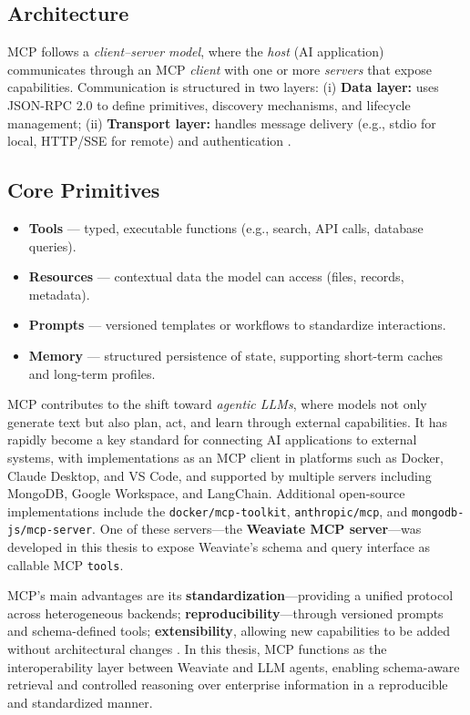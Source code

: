 \subsection{Architecture} 
MCP follows a \textit{client--server model}, where the \textit{host} (AI application) communicates through an MCP \textit{client} with one or more \textit{servers} that expose capabilities. Communication is structured in two layers:
(i) \textbf{Data layer:} uses JSON-RPC 2.0 to define primitives, discovery mechanisms, and lifecycle management;
(ii) \textbf{Transport layer:} handles message delivery (e.g., stdio for local, HTTP/SSE for remote) and authentication \cite{mcp-architecture}.


\subsection{Core Primitives} 
\begin{itemize}
  \item \textbf{Tools} --- typed, executable functions (e.g., search, API calls, database queries).
  \item \textbf{Resources} --- contextual data the model can access (files, records, metadata).
  \item \textbf{Prompts} --- versioned templates or workflows to standardize interactions.
  \item \textbf{Memory} --- structured persistence of state, supporting short-term caches and long-term profiles.
\end{itemize}

MCP contributes to the shift toward \textit{agentic LLMs}, where models not only generate text but also plan, act, and learn through external capabilities.  
It has rapidly become a key standard for connecting AI applications to external systems, with implementations as an MCP client in platforms such as Docker, Claude Desktop, and VS Code, and supported by multiple servers including MongoDB, Google Workspace, and LangChain.  
Additional open-source implementations include the \texttt{docker/mcp-toolkit}, \texttt{anthropic/mcp}, and \texttt{mongodb-js/mcp-server}.  
One of these servers—the \textbf{Weaviate MCP server}—was developed in this thesis to expose Weaviate's schema and query interface as callable MCP \texttt{tools}.  

MCP's main advantages are its \textbf{standardization}—providing a unified protocol across heterogeneous backends; \textbf{reproducibility}—through versioned prompts and schema-defined tools; \textbf{extensibility}, allowing new capabilities to be added without architectural changes \cite{mcp-spec}.
In this thesis, MCP functions as the interoperability layer between Weaviate and LLM agents, enabling schema-aware retrieval and controlled reasoning over enterprise information in a reproducible and standardized manner.

